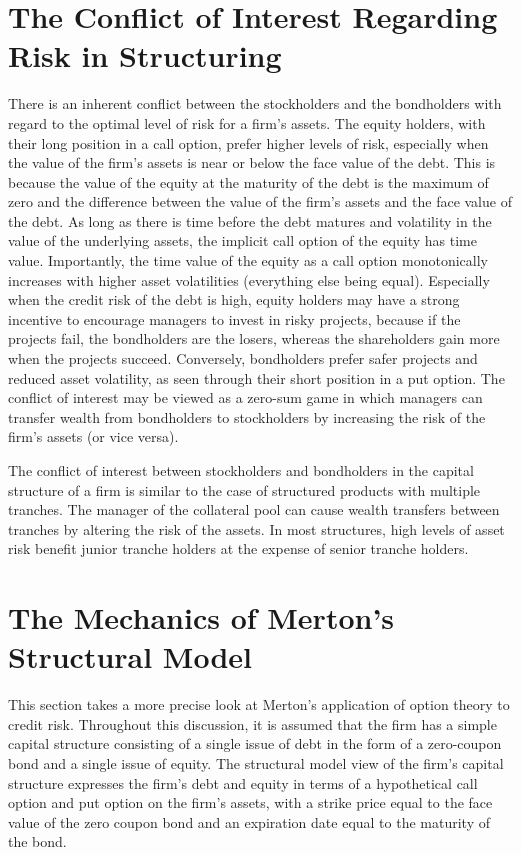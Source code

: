 \documentclass[11pt]{article}
\begin{document}
\section*{The Conflict of Interest Regarding Risk in Structuring}
There is an inherent conflict between the stockholders and the bondholders with regard to the optimal level of risk for a firm's assets. The equity holders, with their long position in a call option, prefer higher levels of risk, especially when the value of the firm's assets is near or below the face value of the debt. This is because the value of the equity at the maturity of the debt is the maximum of zero and the difference between the value of the firm's assets and the face value of the debt. As long as there is time before the debt matures and volatility in the value of the underlying assets, the implicit call option of the equity has time value. Importantly, the time value of the equity as a call option monotonically increases with higher asset volatilities (everything else being equal). Especially when the credit risk of the debt is high, equity holders may have a strong incentive to encourage managers to invest in risky projects, because if the projects fail, the bondholders are the losers, whereas the shareholders gain more when the projects succeed. Conversely, bondholders prefer safer projects and reduced asset volatility, as seen through their short position in a put option. The conflict of interest may be viewed as a zero-sum game in which managers can transfer wealth from bondholders to stockholders by increasing the risk of the firm's assets (or vice versa).

The conflict of interest between stockholders and bondholders in the capital structure of a firm is similar to the case of structured products with multiple tranches. The manager of the collateral pool can cause wealth transfers between tranches by altering the risk of the assets. In most structures, high levels of asset risk benefit junior tranche holders at the expense of senior tranche holders.

\section*{The Mechanics of Merton's Structural Model}
This section takes a more precise look at Merton's application of option theory to credit risk. Throughout this discussion, it is assumed that the firm has a simple capital structure consisting of a single issue of debt in the form of a zero-coupon bond and a single issue of equity. The structural model view of the firm's capital structure expresses the firm's debt and equity in terms of a hypothetical call option and put option on the firm's assets, with a strike price equal to the face value of the zero coupon bond and an expiration date equal to the maturity of the bond.
\end{document}
